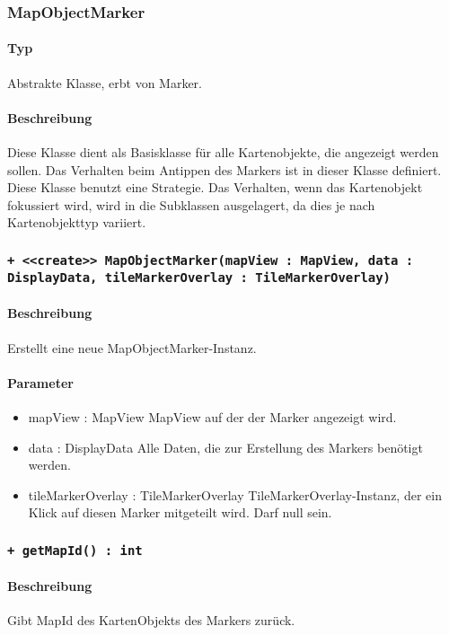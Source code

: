 \subsubsection{MapObjectMarker}
\paragraph*{Typ}
Abstrakte Klasse, erbt von Marker.
\paragraph*{Beschreibung}
Diese Klasse dient als Basisklasse für alle Kartenobjekte, die angezeigt werden sollen.
Das Verhalten beim Antippen des Markers ist in dieser Klasse definiert.
Diese Klasse benutzt eine Strategie. Das Verhalten, wenn das Kartenobjekt fokussiert wird,
wird in die Subklassen ausgelagert, da dies je nach Kartenobjekttyp variiert.

\subsubsection*{\texttt{+ <<create>> MapObjectMarker(mapView : MapView, data : DisplayData, tileMarkerOverlay : TileMarkerOverlay)}}%
\paragraph*{Beschreibung}
Erstellt eine neue MapObjectMarker-Instanz.
\paragraph*{Parameter}
\begin{itemize}
    \item mapView : MapView MapView auf der der Marker angezeigt wird.
    \item data : DisplayData Alle Daten, die zur Erstellung des Markers benötigt werden.
    \item tileMarkerOverlay : TileMarkerOverlay TileMarkerOverlay-Instanz, der ein Klick 
    auf diesen Marker mitgeteilt wird. Darf null sein.
\end{itemize}

\subsubsection*{\texttt{+ getMapId() : int}}%
\paragraph*{Beschreibung}
Gibt MapId des KartenObjekts des Markers zurück.
